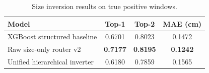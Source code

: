 \begin{table}[t]
\caption{Size inversion results on true positive windows.}
\label{tab:size}
\centering
\begin{tabular}{lccc}
\toprule
Model & Top-1 & Top-2 & MAE (cm) \\
\midrule
XGBoost structured baseline & 0.6701 & 0.8023 & 0.1472 \\
Raw size-only router v2 & \textbf{0.7177} & \textbf{0.8195} & \textbf{0.1242} \\
Unified hierarchical inverter & 0.6180 & 0.7859 & 0.1565 \\
\bottomrule
\end{tabular}
\end{table}
